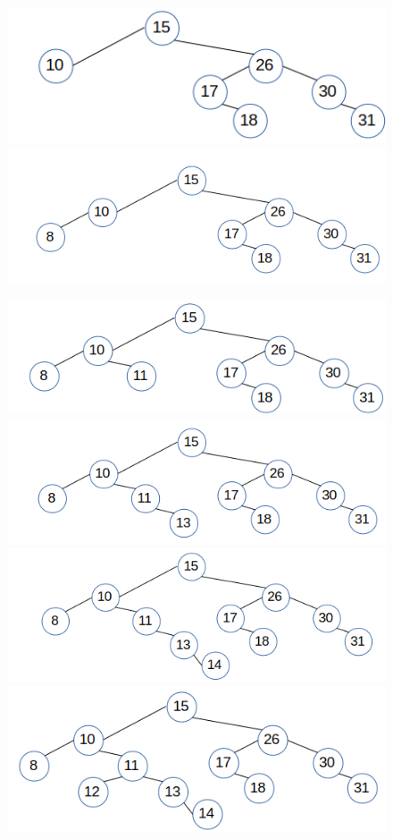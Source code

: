 \documentclass{article}
\begin{document}
\begin{enumerate}
\begin{figure}[H]
	\includegraphics[]{P10/6-10}
	\includegraphics[]{P10/7-8}
\end{figure}

\begin{figure}[H]
	\includegraphics[]{P10/8-11}
	\includegraphics[]{P10/9-13}
	\includegraphics[]{P10/10-14}
	\includegraphics[]{P10/11-12}
\end{figure}


\end{enumerate}
\end{document}
